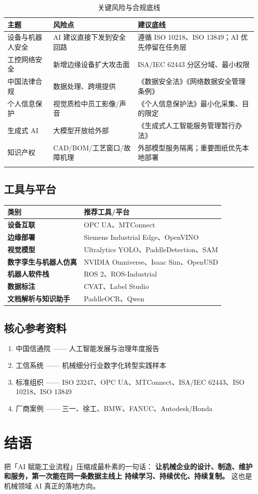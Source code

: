 \documentclass[a4paper,12pt]{ctexart}
\begin{document}
\begin{longtable}{p{3cm}p{4.5cm}p{7cm}}
\toprule
\textbf{主题} & \textbf{风险点} & \textbf{建议底线} \\
\midrule
\endhead
设备与机器人安全 & AI 建议直接下发到安全回路 & 遵循 ISO 10218、ISO 13849；AI 优先停留在任务层 \\
工控网络安全 & 新增边缘设备扩大攻击面 & ISA/IEC 62443 分区分域、最小权限 \\
中国法律合规 & 数据处理、跨境提供 & 《数据安全法》《网络数据安全管理条例》 \\
个人信息保护 & 视觉质检中员工影像/声音 & 《个人信息保护法》最小化采集、目的限定 \\
生成式 AI & 大模型开放给外部 & 《生成式人工智能服务管理暂行办法》 \\
知识产权 & CAD/BOM/工艺窗口/故障机理 & 外部模型服务隔离；重要图纸优先本地部署 \\
\bottomrule
\caption{关键风险与合规底线}
\end{longtable}

\subsection{工具与平台}

\begin{tabular}{>{\bfseries}lp{10cm}}
\toprule
\textbf{类别} & \textbf{推荐工具/平台} \\
\midrule
设备互联 & OPC UA、MTConnect \\
边缘部署 & Siemens Industrial Edge、OpenVINO \\
视觉模型 & Ultralytics YOLO、PaddleDetection、SAM \\
数字孪生与机器人仿真 & NVIDIA Omniverse、Isaac Sim、OpenUSD \\
机器人软件栈 & ROS 2、ROS-Industrial \\
数据标注 & CVAT、Label Studio \\
文档解析与知识助手 & PaddleOCR、Qwen \\
\bottomrule
\end{tabular}

\subsection{核心参考资料}

\begin{enumerate}
\item 中国信通院 —— 人工智能发展与治理年度报告
\item 工信系统 —— 机械细分行业数字化转型实践样本
\item 标准组织 —— ISO 23247、OPC UA、MTConnect、ISA/IEC 62443、ISO 10218、ISO 13849
\item 厂商案例 —— 三一、徐工、BMW、FANUC、Autodesk/Honda
\end{enumerate}

\section*{结语}

\vspace{8pt}
\begin{keypoint}
把「AI 赋能工业流程」压缩成最朴素的一句话：
\textbf{让机械企业的设计、制造、维护和服务，第一次能在同一条数据主线上
持续学习、持续优化、持续复制。}
这也是机械领域 AI 真正的落地方向。
\end{keypoint}
\end{document}
